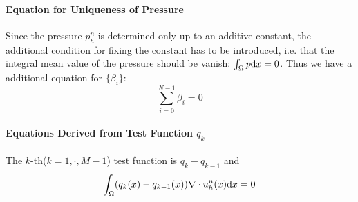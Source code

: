 \paragraph{Equation for Uniqueness of Pressure} Since the pressure $p_h^n$ is determined only up to an additive constant, 
the additional condition for fixing the constant has to be introduced, 
i.e. that the integral mean value of the pressure should be vanish: $\int_\Omega p\mathrm{d} x=0$. Thus we have a additional equation for $\{\beta_i\}$:
\[
  \sum_{i=0}^{N-1}\beta_i=0
  \]

\paragraph{Equations Derived from Test Function $q_k$} The $k$-th($k=1,\cdot,M-1$) test function is $q_k-q_{k-1}$ and 
\begin{equation}\label{eq:equation-testq}
  \int_{\Omega}(q_k(x)-q_{k-1}(x))\nabla\cdot u_h^n(x)\mathrm{d} x=0
\end{equation}

